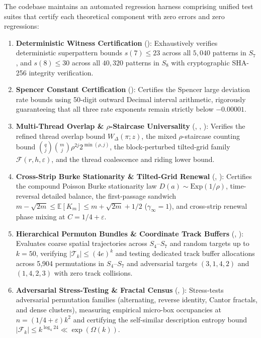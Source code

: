 \documentclass[
  11pt,
]{article}
\begin{document}
The codebase maintains an automated regression harness comprising unified test suites that certify each theoretical component with zero errors and zero regressions:

\begin{enumerate}
\def\labelenumi{\arabic{enumi}.}
\item \textbf{Deterministic Witness Certification} ():
Exhaustively verifies deterministic superpattern bounds $s(7) \le 23$ across all $5{,}040$ patterns in $S_7$, and $s(8) \le 30$ across all $40{,}320$ patterns in $S_8$ with cryptographic SHA-256 integrity verification.

\item \textbf{Spencer Constant Certification} ():
Certifies the Spencer large deviation rate bounds using 50-digit outward Decimal interval arithmetic, rigorously guaranteeing that all three rate exponents remain strictly below $-0.00001$.

\item \textbf{Multi-Thread Overlap \& \(\rho\)-Staircase Universality} (, , ):
Verifies the refined thread overlap bound \(W_\Delta(\pi; z)\), the mixed \(\rho\)-staircase counting bound \(\binom{q}{j}\binom{m}{j}\rho^{2j}2^{\min(\rho, j)}\), the block-perturbed tilted-grid family \(\mathcal{F}(r, h, \varepsilon)\), and the thread coalescence and riding lower bound.

\item \textbf{Cross-Strip Burke Stationarity \& Tilted-Grid Renewal} (, ):
Certifies the compound Poisson Burke stationarity law \(D(a) \sim \mathrm{Exp}(1/\rho)\), time-reversal detailed balance, the first-passage sandwich \(m - \sqrt{2m} \le \mathbb{E}[K_m] \le m + \sqrt{2m} + 1/2\) (\(\gamma_\infty = 1\)), and cross-strip renewal phase mixing at \(C = 1/4 + \varepsilon\).

\item \textbf{Hierarchical Permuton Bundles \& Coordinate Track Buffers} (, ):
Evaluates coarse spatial trajectories across $S_4$--$S_7$ and random targets up to $k = 50$, verifying $|\mathcal{T}_k| \le (4e)^k$ and testing dedicated track buffer allocations across 5,904 permutations in $S_4$--$S_7$ and adversarial targets $(3, 1, 4, 2)$ and $(1, 4, 2, 3)$ with zero track collisions.

\item \textbf{Adversarial Stress-Testing \& Fractal Census} (, ):
Stress-tests adversarial permutation families (alternating, reverse identity, Cantor fractals, and dense clusters), measuring empirical micro-box occupancies at $n = (1/4+\varepsilon)k^2$ and certifying the self-similar description entropy bound $|\mathcal{F}_k| \le k^{\log_4 24} \ll \exp(\Omega(k))$.
\end{enumerate}
\end{document}
